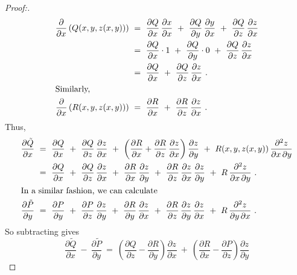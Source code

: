 \begin{proofbar}
\begin{proof}[Proof:]
 \begin{align*}
  \frac{\partial}{\partial x} \left( Q(x,y,z(x,y)) \right) ~&=~
   \frac{\partial Q}{\partial x}\,\frac{\partial x}{\partial x} ~+~
   \frac{\partial Q}{\partial y}\,\frac{\partial y}{\partial x} ~+~
   \frac{\partial Q}{\partial z}\,\frac{\partial z}{\partial x}\\
   &=~ \frac{\partial Q}{\partial x} \cdot 1 ~+~ \frac{\partial Q}{\partial y} \cdot 0 ~+~ \frac{\partial Q}{\partial z}\,
    \frac{\partial z}{\partial x}\\
   &=~ \frac{\partial Q}{\partial x} ~+~ \frac{\partial Q}{\partial z}\,\frac{\partial z}{\partial x} ~.\\
  \intertext{Similarly,}
  \frac{\partial}{\partial x} \left( R(x,y,z(x,y)) \right) ~&=~
   \frac{\partial R}{\partial x} ~+~ \frac{\partial R}{\partial z}\,\frac{\partial z}{\partial x} ~.
\end{align*}
 Thus,
 \begin{align*}
  \frac{\partial \tilde{Q}}{\partial x} ~&=~ \frac{\partial Q}{\partial x} ~+~ \frac{\partial Q}{\partial z}\,
   \frac{\partial z}{\partial x} ~+~ \left( \frac{\partial R}{\partial x} + \frac{\partial R}{\partial z}\,
   \frac{\partial z}{\partial x} \right) \frac{\partial z}{\partial y} ~+~ R(x,y,z(x,y))\,
   \frac{\partial^2 z}{\partial x \, \partial y}\\
   &=~ \frac{\partial Q}{\partial x} ~+~ \frac{\partial Q}{\partial z}\,\frac{\partial z}{\partial x} ~+~
    \frac{\partial R}{\partial x}\,\frac{\partial z}{\partial y} ~+~ \frac{\partial R}{\partial z}\,
    \frac{\partial z}{\partial x}\,\frac{\partial z}{\partial y} ~+~ R\,\frac{\partial^2 z}{\partial x \, \partial y}~.\\
  \intertext{In a similar fashion, we can calculate}
  \frac{\partial \tilde{P}}{\partial y} ~&=~ \frac{\partial P}{\partial y} ~+~
   \frac{\partial P}{\partial z}\,\frac{\partial z}{\partial y} ~+~
    \frac{\partial R}{\partial y}\,\frac{\partial z}{\partial x} ~+~ \frac{\partial R}{\partial z}\,
    \frac{\partial z}{\partial y}\,\frac{\partial z}{\partial x} ~+~ R\,\frac{\partial^2 z}{\partial y \, \partial x}~.
 \end{align*}
 So subtracting gives
 \begin{equation}\label{eqn:stokeslong}
  \frac{\partial \tilde{Q}}{\partial x} ~-~ \frac{\partial \tilde{P}}{\partial y} ~=~
   \left( \frac{\partial Q}{\partial z} - \frac{\partial R}{\partial y} \right) \frac{\partial z}{\partial x}
   ~+~ \left( \frac{\partial R}{\partial x} - \frac{\partial P}{\partial z}\right) \frac{\partial z}{\partial y}

\end{equation}
\end{proof}
\end{proofbar}
